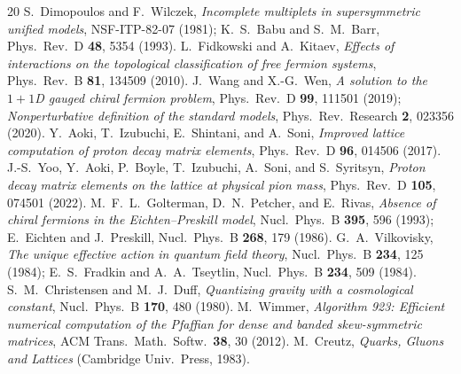 \documentclass[11pt,a4paper]{article}
\begin{document}
\begin{thebibliography}{20}
 S.~Dimopoulos and F.~Wilczek, \textit{Incomplete multiplets in supersymmetric unified models}, NSF-ITP-82-07 (1981); K.~S.~Babu and S.~M.~Barr, Phys.\ Rev.\ D \textbf{48}, 5354 (1993).
 L.~Fidkowski and A.~Kitaev, \textit{Effects of interactions on the topological classification of free fermion systems}, Phys.\ Rev.\ B \textbf{81}, 134509 (2010).
 J.~Wang and X.-G.~Wen, \textit{A solution to the $1+1$D gauged chiral fermion problem}, Phys.\ Rev.\ D \textbf{99}, 111501 (2019); \textit{Nonperturbative definition of the standard models}, Phys.\ Rev.\ Research \textbf{2}, 023356 (2020).
 Y.~Aoki, T.~Izubuchi, E.~Shintani, and A.~Soni, \textit{Improved lattice computation of proton decay matrix elements}, Phys.\ Rev.\ D \textbf{96}, 014506 (2017).
 J.-S.~Yoo, Y.~Aoki, P.~Boyle, T.~Izubuchi, A.~Soni, and S.~Syritsyn, \textit{Proton decay matrix elements on the lattice at physical pion mass}, Phys.\ Rev.\ D \textbf{105}, 074501 (2022).
 M.~F.~L.~Golterman, D.~N.~Petcher, and E.~Rivas, \textit{Absence of chiral fermions in the Eichten--Preskill model}, Nucl.\ Phys.\ B \textbf{395}, 596 (1993); E.~Eichten and J.~Preskill, Nucl.\ Phys.\ B \textbf{268}, 179 (1986).
 G.~A.~Vilkovisky, \textit{The unique effective action in quantum field theory}, Nucl.\ Phys.\ B \textbf{234}, 125 (1984); E.~S.~Fradkin and A.~A.~Tseytlin, Nucl.\ Phys.\ B \textbf{234}, 509 (1984).
 S.~M.~Christensen and M.~J.~Duff, \textit{Quantizing gravity with a cosmological constant}, Nucl.\ Phys.\ B \textbf{170}, 480 (1980).
 M.~Wimmer, \textit{Algorithm 923: Efficient numerical computation of the Pfaffian for dense and banded skew-symmetric matrices}, ACM Trans.\ Math.\ Softw.\ \textbf{38}, 30 (2012).
 M.~Creutz, \textit{Quarks, Gluons and Lattices} (Cambridge Univ.\ Press, 1983).
\end{thebibliography}
\end{document}
